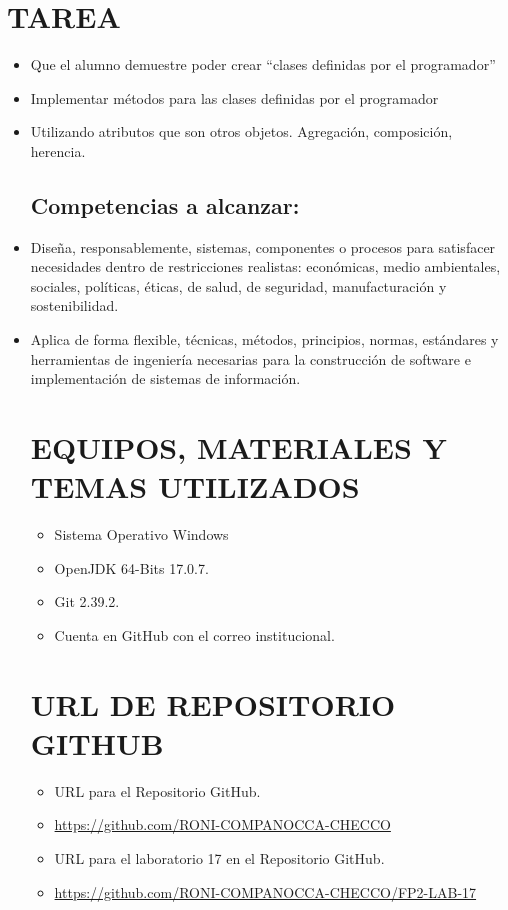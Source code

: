 \documentclass{article}
\begin{document}
    \section{TAREA}
	\begin{itemize}	
    \subsection{Objetivos:}
		\item Que el alumno demuestre poder crear “clases definidas por el programador”
		\item Implementar métodos para las clases definidas por el programador
        \item Utilizando atributos que son otros objetos. Agregación, composición, herencia.
       
    \subsection{Competencias a alcanzar:}
		\item Diseña, responsablemente, sistemas, componentes o procesos para satisfacer necesidades dentro de restricciones realistas: económicas, medio ambientales, sociales, políticas, éticas, de salud, de seguridad, manufacturación y sostenibilidad. 
        \item Aplica de forma flexible, técnicas, métodos, principios, normas, estándares y herramientas de ingeniería necesarias para la construcción de software e implementación de sistemas de información.

    \section{EQUIPOS, MATERIALES Y TEMAS UTILIZADOS}
	\begin{itemize}
		\item Sistema Operativo Windows
		\item OpenJDK 64-Bits 17.0.7.
		\item Git 2.39.2.	
  	\item Cuenta en GitHub con el correo institucional.
	\end{itemize}

    \section{URL DE REPOSITORIO GITHUB}
	\begin{itemize}
		\item URL para el Repositorio GitHub.
		\item \url{https://github.com/RONI-COMPANOCCA-CHECCO}
		\item URL para el laboratorio 17 en el Repositorio GitHub.	
        \item \url{https://github.com/RONI-COMPANOCCA-CHECCO/FP2-LAB-17}
	\end{itemize}


\end{itemize}
\end{document}
